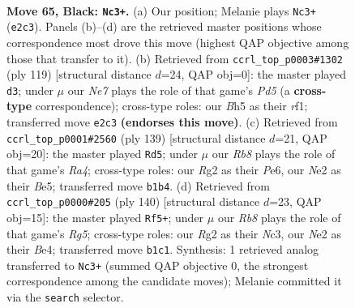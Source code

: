 \documentclass[11pt]{article}
\begin{document}
\clearpage

\begin{figure}[p]\centering
\begin{subfigure}{0.46\textwidth}\centering
\resizebox{\linewidth}{!}{%
\newchessgame
\chessboard[
  setfen={8/7p/5k2/4p2b/8/8/K3n1r1/1r6 b - - 4 65},
  showmover=false,
  pgfstyle=straightmove, color=movearrow, markmove={e2-c3}
]}
\caption{}
\end{subfigure}\hfill
\begin{subfigure}{0.46\textwidth}\centering
\resizebox{\linewidth}{!}{%
\newchessgame
\chessboard[
  setfen={3r4/8/2K1k3/1p6/1P1p4/8/8/5R2 b - - 5 60},
  showmover=false,
  pgfstyle=straightmove, color=movearrow, markmove={d4-d3}
]}
\caption{}
\end{subfigure}
\\[4pt]
\begin{subfigure}{0.46\textwidth}\centering
\resizebox{\linewidth}{!}{%
\newchessgame
\chessboard[
  setfen={8/1P6/4p3/r3b1nk/1K6/3Q4/8/8 b - - 1 70},
  showmover=false,
  pgfstyle=straightmove, color=movearrow, markmove={a5-d5}
]}
\caption{}
\end{subfigure}\hfill
\begin{subfigure}{0.46\textwidth}\centering
\resizebox{\linewidth}{!}{%
\newchessgame
\chessboard[
  setfen={8/5k2/r7/6R1/2K1Bb2/2N5/8/8 w - - 33 71},
  showmover=false,
  pgfstyle=straightmove, color=movearrow, markmove={g5-f5}
]}
\caption{}
\end{subfigure}
\caption{\textbf{Move 65, Black: \texttt{Nc3+}.} (a) Our position; Melanie plays \texttt{Nc3+} (\texttt{e2c3}). Panels (b)--(d) are the retrieved master positions whose correspondence most drove this move (highest QAP objective among those that transfer to it). (b) Retrieved from \texttt{ccrl\_top\_p0003\#1302} (ply 119) [structural distance $d$=24, QAP obj=0]: the master played \texttt{d3}; under $\mu$ our \emph{Ne7} plays the role of that game's \emph{Pd5} (a \textbf{cross-type} correspondence); cross-type roles: our \emph{B}h5 as their \emph{r}f1; transferred move \texttt{e2c3} \textbf{(endorses this move)}. (c) Retrieved from \texttt{ccrl\_top\_p0001\#2560} (ply 139) [structural distance $d$=21, QAP obj=20]: the master played \texttt{Rd5}; under $\mu$ our \emph{Rb8} plays the role of that game's \emph{Ra4}; cross-type roles: our \emph{R}g2 as their \emph{P}e6, our \emph{N}e2 as their \emph{B}e5; transferred move \texttt{b1b4}. (d) Retrieved from \texttt{ccrl\_top\_p0000\#205} (ply 140) [structural distance $d$=23, QAP obj=15]: the master played \texttt{Rf5+}; under $\mu$ our \emph{Rb8} plays the role of that game's \emph{Rg5}; cross-type roles: our \emph{R}g2 as their \emph{N}c3, our \emph{N}e2 as their \emph{B}e4; transferred move \texttt{b1c1}. Synthesis: 1 retrieved analog transferred to \texttt{Nc3+} (summed QAP objective 0, the strongest correspondence among the candidate moves); Melanie committed it via the \texttt{search} selector.}
\label{fig:thought-m129}
\end{figure}
\end{document}
